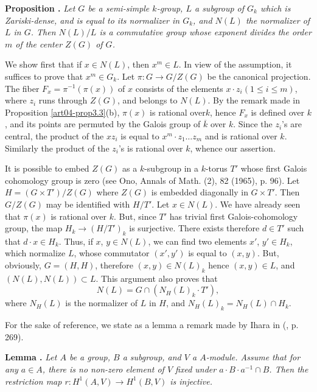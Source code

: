 \smallskip
\noindent
{\bf Proposition .\label{art04-prop3.4}}
{\em Let $G$ be a semi-simple $k$-group, $L$ a subgroup of $G_{k}$ which is Zariski-dense, and is equal to its normalizer in $G_{k}$, and $N(L)$ the normalizer of $L$ in $G$. Then $N(L)/L$ is a commutative group whose exponent divides the order $m$ of the center $Z(G)$ of $G$.}


We show first that if $x\in N(L)$, then $x^{m}\in L$. In view of the assumption, it suffices to prove that $x^{m}\in G_{k}$. Let $\pi:G\to G/Z(G)$ be the canonical projection. The fiber $F_{x}=\pi^{-1}(\pi(x))$ of $x$ consists of the elements $x\cdot z_{i}(1\leq i\leq m)$, where $z_{i}$ runs through $Z(G)$, and belongs to $N(L)$. By the remark made in Proposition \ref{art04-prop3.3}(b), $\pi(x)$ is rational over\pageoriginale $k$, hence $F_{x}$ is defined over $k$, and its points are permuted by the Galois group of $\overline{k}$ over $k$. Since the $z_{i}$'s are central, the product of the $xz_{i}$ is equal to $x^{m}\cdot z_{1}\ldots z_{m}$ and is rational over $k$. Similarly the product of the $z_{i}$'s is rational over $k$, whence our assertion.

It is possible to embed $Z(G)$ as a $k$-subgroup in a $k$-torus $T'$ whose first Galois cohomology group is zero (see Ono, Annals of Math. (2), 82 (1965), p. 96). Let $H=(G\times T')/Z(G)$ where $Z(G)$ is embedded diagonally in $G\times T'$. Then $G/Z(G)$ may be identified with $H/T'$. Let $x\in N(L)$. We have already seen that $\pi(x)$ is rational over $k$. But, since $T'$ has trivial first Galois-cohomology group, the map $H_{k}\to (H/T')_{k}$ is surjective. There exists therefore $d\in T'$ such that $d\cdot x\in H_{k}$. Thus, if $x$, $y\in N(L)$, we can find two elements $x'$, $y'\in H_{k}$, which normalize $L$, whose commutator $(x',y')$ is equal to $(x,y)$. But, obviously, $G=(H,H)$, therefore $(x,y)\in N(L)_{k}$ hence $(x,y)\in L$, and $(N(L),N(L))\subset L$. This argument also proves that
\setcounter{equation}{0}
\begin{equation*}
N(L)=G\cap (N_{H}(L)_{k}\cdot T'),\tag{1}\label{art04-prop3.4-eq1}
\end{equation*}
where $N_{H}(L)$ is the normalizer of $L$ in $H$, and $N_{H}(L)_{k}=N_{H}(L)\cap H_{k}$.

For the sake of reference, we state as a lemma a remark made by Ihara in (\cite{art04-key14}, p. 269).

\medskip
\noindent
{\bf Lemma .\label{art04-lem3.5}}
{\em Let $A$ be a group, $B$ a subgroup, and $V$ a $A$-module. Assume that for any $a\in A$, there is no non-zero element of $V$ fixed under $a\cdot B\cdot a^{-1}\cap B$. Then the restriction map $r:H^{1}(A,V)\to H^{1}(B,V)$ is injective.}
\smallskip

